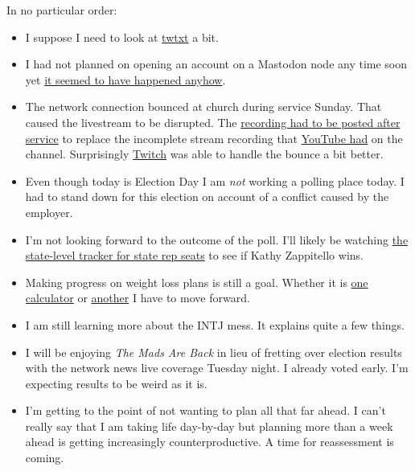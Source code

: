 In no particular order:

\begin{itemize}
\tightlist
\item
  I suppose I need to look at
  \href{https://github.com/buckket/twtxt}{twtxt} a bit.
\item
  I had not planned on opening an account on a Mastodon node any time
  soon yet \href{https://mas.to/@smkellat}{it seemed to have happened
  anyhow}.
\item
  The network connection bounced at church during service Sunday. That
  caused the livestream to be disrupted. The
  \href{https://youtu.be/ygrygzUnsL8}{recording had to be posted after
  service} to replace the incomplete stream recording that
  \href{https://www.youtube.com/channel/UCs1dDMVsjKcgeOynUXZkZww}{YouTube
  had} on the channel. Surprisingly
  \href{https://www.twitch.tv/GenevaChurchOfChrist}{Twitch} was able to
  handle the bounce a bit better.
\item
  Even though today is Election Day I am \emph{not} working a polling
  place today. I had to stand down for this election on account of a
  conflict caused by the employer.
\item
  I'm not looking forward to the outcome of the poll. I'll likely be
  watching \href{https://liveresults.ohiosos.gov/}{the state-level
  tracker for state rep seats} to see if Kathy Zappitello wins.
\item
  Making progress on weight loss plans is still a goal. Whether it is
  \href{https://www.nasmbwpcalculator.com/}{one calculator} or
  \href{https://www.niddk.nih.gov/bwp}{another} I have to move forward.
\item
  I am still learning more about the INTJ mess. It explains quite a few
  things.\\
\item
  I will be enjoying \emph{The Mads Are Back} in lieu of fretting over
  election results with the network news live coverage Tuesday night. I
  already voted early. I'm expecting results to be weird as it is.
\item
  I'm getting to the point of not wanting to plan all that far ahead. I
  can't really say that I am taking life day-by-day but planning more
  than a week ahead is getting increasingly counterproductive. A time
  for reassessment is coming.
\end{itemize}

